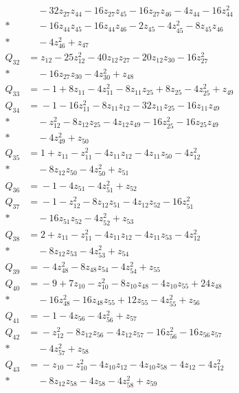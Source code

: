 \begin{align*}
&\quad{} - 32z_{27}z_{44} - 16z_{27}z_{45} - 16z_{27}z_{46} - 4z_{44} - 16z_{44}^{2}\\*
&\quad{} - 16z_{44}z_{45} - 16z_{44}z_{46} - 2z_{45} - 4z_{45}^{2} - 8z_{45}z_{46}\\*
&\quad{} - 4z_{46}^{2} + z_{47}\\[4pt]
Q_{32} &={}z_{12} - 25z_{12}^{2} - 40z_{12}z_{27} - 20z_{12}z_{30} - 16z_{27}^{2}\\*
&\quad{} - 16z_{27}z_{30} - 4z_{30}^{2} + z_{48}\\[4pt]
Q_{33} &={}-1 + 8z_{11} - 4z_{11}^{2} - 8z_{11}z_{25} + 8z_{25} - 4z_{25}^{2} + z_{49}\\[4pt]
Q_{34} &={}-1 - 16z_{11}^{2} - 8z_{11}z_{12} - 32z_{11}z_{25} - 16z_{11}z_{49}\\*
&\quad{} - z_{12}^{2} - 8z_{12}z_{25} - 4z_{12}z_{49} - 16z_{25}^{2} - 16z_{25}z_{49}\\*
&\quad{} - 4z_{49}^{2} + z_{50}\\[4pt]
Q_{35} &={}1 + z_{11} - z_{11}^{2} - 4z_{11}z_{12} - 4z_{11}z_{50} - 4z_{12}^{2}\\*
&\quad{} - 8z_{12}z_{50} - 4z_{50}^{2} + z_{51}\\[4pt]
Q_{36} &={}-1 - 4z_{51} - 4z_{51}^{2} + z_{52}\\[4pt]
Q_{37} &={}-1 - z_{12}^{2} - 8z_{12}z_{51} - 4z_{12}z_{52} - 16z_{51}^{2}\\*
&\quad{} - 16z_{51}z_{52} - 4z_{52}^{2} + z_{53}\\[4pt]
Q_{38} &={}2 + z_{11} - z_{11}^{2} - 4z_{11}z_{12} - 4z_{11}z_{53} - 4z_{12}^{2}\\*
&\quad{} - 8z_{12}z_{53} - 4z_{53}^{2} + z_{54}\\[4pt]
Q_{39} &={}-4z_{48}^{2} - 8z_{48}z_{54} - 4z_{54}^{2} + z_{55}\\[4pt]
Q_{40} &={}-9 + 7z_{10} - z_{10}^{2} - 8z_{10}z_{48} - 4z_{10}z_{55} + 24z_{48}\\*
&\quad{} - 16z_{48}^{2} - 16z_{48}z_{55} + 12z_{55} - 4z_{55}^{2} + z_{56}\\[4pt]
Q_{41} &={}-1 - 4z_{56} - 4z_{56}^{2} + z_{57}\\[4pt]
Q_{42} &={}-z_{12}^{2} - 8z_{12}z_{56} - 4z_{12}z_{57} - 16z_{56}^{2} - 16z_{56}z_{57}\\*
&\quad{} - 4z_{57}^{2} + z_{58}\\[4pt]
Q_{43} &={}-z_{10} - z_{10}^{2} - 4z_{10}z_{12} - 4z_{10}z_{58} - 4z_{12} - 4z_{12}^{2}\\*
&\quad{} - 8z_{12}z_{58} - 4z_{58} - 4z_{58}^{2} + z_{59}\\[4pt]

\end{align*}
